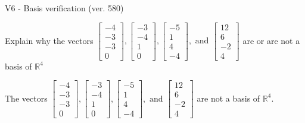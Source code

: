 \begin{exercise}
  \begin{exerciseTitle}V6 - Basis verification (ver. 580)\end{exerciseTitle}
  \begin{exerciseStatement}
    Explain why the vectors \(\left[\begin{array}{r}
-4 \\
-3 \\
-3 \\
0
\end{array}\right] , \left[\begin{array}{r}
-3 \\
-4 \\
1 \\
0
\end{array}\right] , \left[\begin{array}{r}
-5 \\
1 \\
4 \\
-4
\end{array}\right] , \text{ and } \left[\begin{array}{r}
12 \\
6 \\
-2 \\
4
\end{array}\right]\) are or are not a basis of \(\mathbb{R}^4\)	


  \end{exerciseStatement}
  \begin{exerciseAnswer}
   The vectors \(\left[\begin{array}{r}
-4 \\
-3 \\
-3 \\
0
\end{array}\right] , \left[\begin{array}{r}
-3 \\
-4 \\
1 \\
0
\end{array}\right] , \left[\begin{array}{r}
-5 \\
1 \\
4 \\
-4
\end{array}\right] , \text{ and } \left[\begin{array}{r}
12 \\
6 \\
-2 \\
4
\end{array}\right]\) 
  	 are not  a basis of \(\mathbb{R}^4\).
  


  \end{exerciseAnswer}
\end{exercise}